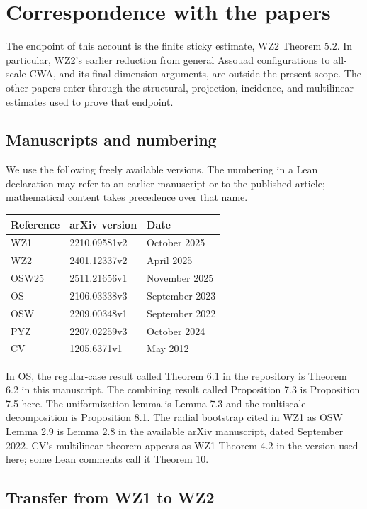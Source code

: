 \chapter{Correspondence with the papers}
\label{chap:correspondence}

The endpoint of this account is the finite sticky estimate, WZ2
Theorem 5.2. In particular, WZ2's earlier reduction from general
Assouad configurations to all-scale CWA, and its final dimension
arguments, are outside the present scope. The other papers enter
through the structural, projection, incidence, and multilinear estimates
used to prove that endpoint.

\section{Manuscripts and numbering}

We use the following freely available versions. The numbering in a
Lean declaration may refer to an earlier manuscript or to the published
article; mathematical content takes precedence over that name.

\begin{center}
\begin{tabular}{lll}
Reference & arXiv version & Date \\
\hline
WZ1 & 2210.09581v2 & October 2025 \\
WZ2 & 2401.12337v2 & April 2025 \\
OSW25 & 2511.21656v1 & November 2025 \\
OS & 2106.03338v3 & September 2023 \\
OSW & 2209.00348v1 & September 2022 \\
PYZ & 2207.02259v3 & October 2024 \\
CV & 1205.6371v1 & May 2012
\end{tabular}
\end{center}

In OS, the regular-case result called Theorem 6.1 in the repository
is Theorem 6.2 in this manuscript. The combining result called
Proposition 7.3 is Proposition 7.5 here. The uniformization lemma is
Lemma 7.3 and the multiscale decomposition is Proposition 8.1.
The radial bootstrap cited in WZ1 as OSW Lemma 2.9 is Lemma 2.8
in the available arXiv manuscript, dated September 2022.
CV's multilinear theorem appears as WZ1 Theorem 4.2 in the version
used here; some Lean comments call it Theorem 10.

\section{Transfer from WZ1 to WZ2}
\label{sec:wz1-wz2-transfer}


